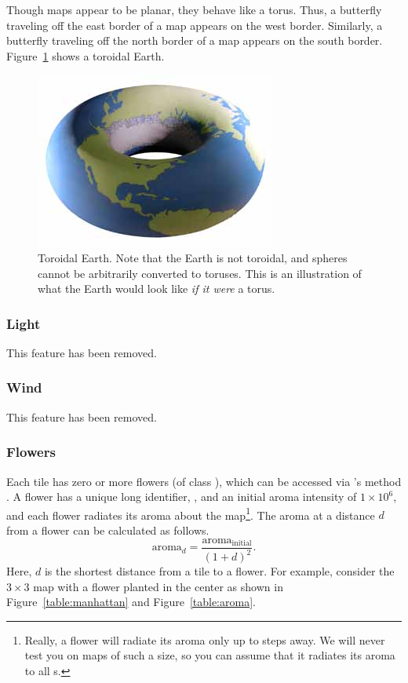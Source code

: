 \documentclass{pset}
\newcommand{\removed}{This feature has been removed.}
\begin{document}
Though maps appear to be planar, they behave like a torus. Thus, a butterfly
traveling off the east border of a map appears on the west border. Similarly, a
butterfly traveling off the north border of a map appears on the south border.
Figure~\ref{fig:torus} shows a toroidal Earth.

\begin{figure}[h]
    \centering
    \includegraphics[scale=0.5]{img/torus.jpg}
    \caption{Toroidal Earth. Note that the Earth is not toroidal, and spheres
        cannot be arbitrarily converted to toruses. This is an illustration of
        what the Earth would look like \textit{if it were} a torus.}
    \label{fig:torus}
\end{figure}

\subsubsection{Light}
\removed{}

\subsubsection{Wind}
\removed{}

\subsubsection{Flowers} \label{sec:flowers}
Each tile has zero or more flowers (of class ), which can be
accessed via 's method . A flower has a
unique long identifier, , and an initial aroma intensity of $1
\times 10^6$, and each flower radiates its aroma about the map\footnote{Really,
a flower will  radiate its aroma only up to  steps
away. We will never test you on maps of such a size, so you can assume that it
radiates its aroma to all s.}. The aroma at a distance $d$ from a
flower can be calculated as follows.  \[\text{aroma}_d =
\frac{\text{aroma}_{\text{initial}}}{(1 + d)^2}.\] Here, $d$ is the shortest
distance from a tile to a flower. For example, consider the $3 \times 3$ map
with a flower planted in the center as shown in Figure~\ref{table:manhattan} and
Figure~\ref{table:aroma}.  
\end{document}
